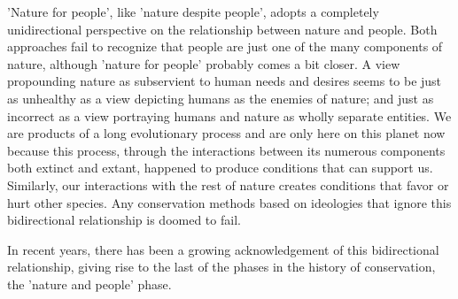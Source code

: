 \documentclass[rutwik_proposal.tex]{subfiles}
\begin{document}
'Nature for people', like 'nature despite people', adopts a completely unidirectional perspective on the relationship between nature and people. Both approaches fail to recognize that people are just one of the many components of nature, although 'nature for people' probably comes a bit closer. A view propounding nature as subservient to human needs and desires seems to be just as unhealthy as a view depicting humans as the enemies of nature; and just as incorrect as a view portraying humans and nature as wholly separate entities. We are products of a long evolutionary process and are only here on this planet now because this process, through the interactions between its numerous components both extinct and extant, happened to produce conditions that can support us. Similarly, our interactions with the rest of nature creates conditions that favor or hurt other species. Any conservation methods based on ideologies that ignore this bidirectional relationship is doomed to fail.

In recent years, there has been a growing acknowledgement of this bidirectional relationship, giving rise to the last of the phases in the history of conservation, the 'nature and people' phase.
\end{document}
